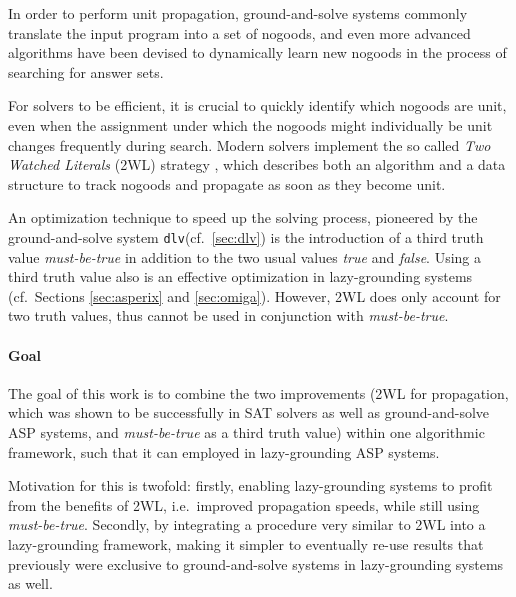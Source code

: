 \documentclass{vutinfth} %
\newcommand{\mbt}{must-be-true\xspace}
\newcommand{\dlv}{\texttt{dlv}\xspace}
\begin{document}
In order to perform unit propagation, ground-and-solve systems commonly translate the input program into a set of nogoods, and even more advanced algorithms have been devised to dynamically learn new nogoods in the process of searching for answer sets. 

For solvers to be efficient, it is crucial to quickly identify which nogoods are unit, even when the assignment under which the nogoods might individually be unit changes frequently during search. Modern solvers implement the so called \emph{Two Watched Literals} (2WL) strategy \cite{effsat,questsat}, which describes both an algorithm and a data structure to track nogoods and propagate as soon as they become unit.

An optimization technique to speed up the solving process, pioneered by the ground-and-solve system \dlv (cf.~\ref{sec:dlv}) is the introduction of a third truth value \emph{\mbt} in addition to the two usual values \emph{true} and \emph{false}. Using a third truth value also is an effective optimization in lazy-grounding systems (cf.~Sections \ref{sec:asperix} and \ref{sec:omiga}). However, 2WL does only account for two truth values, thus cannot be used in conjunction with \emph{\mbt}.

\paragraph{Goal} The goal of this work is to combine the two improvements (2WL for propagation, which was shown to be successfully in SAT solvers as well as ground-and-solve ASP systems, and \emph{\mbt} as a third truth value) within one algorithmic framework, such that it can employed in lazy-grounding ASP systems.

Motivation for this is twofold: firstly, enabling lazy-grounding systems to profit from the benefits of 2WL, i.e.~improved propagation speeds, while still using \emph{\mbt}. Secondly, by integrating a procedure very similar to 2WL into a lazy-grounding framework, making it simpler to eventually re-use results that previously were exclusive to ground-and-solve systems in lazy-grounding systems as well.


\end{document}
